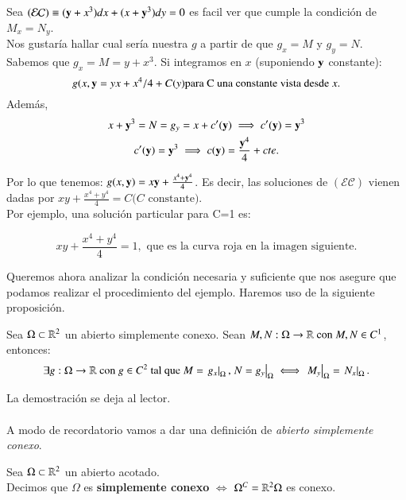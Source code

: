 \begin{eg}
    Sea $\mathcal{(EC)} \equiv (\mathbf{y}+x^3) dx + (x+\mathbf{y}^3) dy = 0$ es facil ver que cumple la condición de $M_x = N_y$.\\
    Nos gustaría hallar cual sería nuestra $g$ a partir de que $g_x=M$ y $g_y=N$. Sabemos que $g_x = M = y + x^3$.
    Si integramos en $x$ (suponiendo $\mathbf{y}$ constante):
    $$
    g(x,\mathbf{y} = yx + x^4/4 + C(y) \text{para C una constante vista desde $x$}.
    $$
    Además,
    \begin{gather*}
        x+\mathbf{y}^3 = N = g_y = x + c'(\mathbf{y}) \implies c'(\mathbf{y}) = \mathbf{y}^3\\
        c'(\mathbf{y}) = \mathbf{y}^3 \implies c(\mathbf{y}) = \frac{\mathbf{y}^4}{4} + cte.
    \end{gather*}

    Por lo que tenemos: $g(x,\mathbf{y}) = x\mathbf{y} + \frac{x^4+\mathbf{y}^4}{4}$. Es decir, las soluciones de $\mathcal{(EC)}$ vienen dadas por $xy + \frac{x^4+y^4}{4} = C \text{($C$ constante)}$.\\

    Por ejemplo, una solución particular para C=1 es:

    $$xy + \frac{x^4+y^4}{4} = 1, \text{ que es la curva roja en la imagen siguiente.}$$
    \begin{center}
    \end{center}
\end{eg}

Queremos ahora analizar la condición necesaria y suficiente que nos asegure que podamos realizar el procedimiento del ejemplo. Haremos uso de la siguiente proposición.
\begin{pro}
Sea $\Omega\subset\mathbb{R}^2$ un abierto simplemente conexo. Sean $M, N : \Omega \to \mathbb{R}\text{ con } M,N \in C^1$, entonces:
$$
\exists g : \Omega \to \mathbb{R} \text{ con } g \in C^2 \text{ tal que } M = \left.g_x\right|_\Omega, \left.N=g_y\right|_\Omega \iff \left.M_y\right|_\Omega = \left.N_x\right|_\Omega.
    $$
\end{pro}
La demostración se deja al lector.\\\\
A modo de recordatorio vamos a dar una definición de \textit{abierto simplemente conexo}.
\begin{dfn}
    Sea $\Omega \subset \mathbb{R}^2$ un abierto acotado.\\
    Decimos que $\Omega$ es \textbf{simplemente conexo} $\iff$ $\Omega^C = \mathbb{R}^2\Omega$ es conexo.
\end{dfn}

